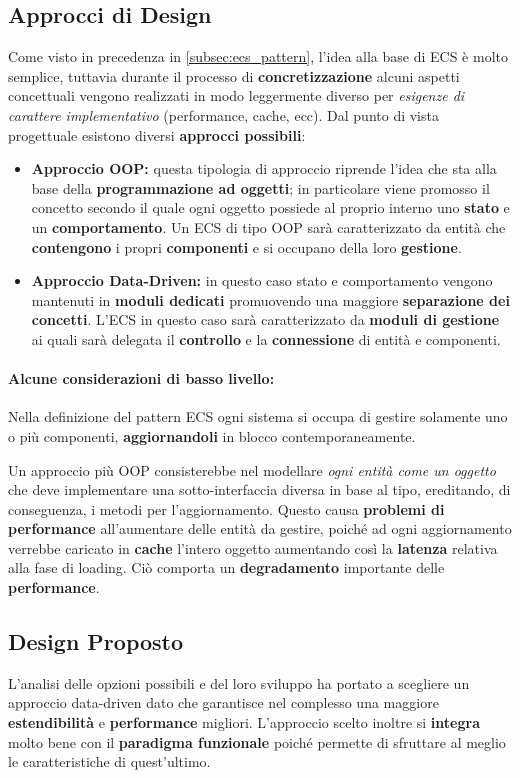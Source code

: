 \subsection{Approcci di Design}
Come visto in precedenza in \ref{subsec:ecs_pattern}, l'idea alla base di ECS è molto semplice, tuttavia durante il processo di \textbf{concretizzazione} alcuni aspetti concettuali vengono realizzati in modo leggermente diverso per \textit{esigenze di carattere implementativo} (performance, cache, ecc).  Dal punto di vista progettuale esistono diversi \textbf{approcci possibili}:
\begin{itemize}
	\item{\textbf{Approccio OOP:}} questa tipologia di approccio riprende l'idea che sta alla base della \textbf{programmazione ad oggetti}; in particolare viene promosso il concetto secondo il quale ogni oggetto possiede al proprio interno uno \textbf{stato} e un \textbf{comportamento}. Un ECS di tipo OOP sarà caratterizzato da entità che \textbf{contengono} i propri \textbf{componenti} e si occupano della loro \textbf{gestione}.
	\item{\textbf{Approccio Data-Driven:}} in questo caso stato e comportamento vengono mantenuti in \textbf{moduli dedicati} promuovendo una maggiore \textbf{separazione dei concetti}. L'ECS in questo caso sarà caratterizzato da \textbf{moduli di gestione} ai quali sarà delegata il \textbf{controllo} e la \textbf{connessione} di entità e componenti.
\end{itemize}

\paragraph{Alcune considerazioni di basso livello:}
Nella definizione del pattern ECS ogni sistema si occupa di gestire solamente uno o più componenti, \textbf{aggiornandoli} in blocco contemporaneamente. 

Un approccio più OOP consisterebbe nel modellare \textit{ogni entità come un oggetto} che deve implementare una sotto-interfaccia diversa in base al tipo, ereditando, di conseguenza, i metodi per l'aggiornamento. Questo causa \textbf{problemi di performance} all'aumentare delle entità da gestire, poiché ad ogni aggiornamento verrebbe caricato in \textbf{cache} l'intero oggetto aumentando così la \textbf{latenza} relativa alla fase di loading. Ciò comporta un \textbf{degradamento} importante delle \textbf{performance}.


\subsection{Design Proposto}
L'analisi delle opzioni possibili e del loro sviluppo ha portato a scegliere un approccio data-driven dato che garantisce nel complesso una maggiore \textbf{estendibilità} e \textbf{performance} migliori. L'approccio scelto inoltre si \textbf{integra} molto bene con il \textbf{paradigma funzionale} poiché permette di sfruttare al meglio le caratteristiche di quest'ultimo.

